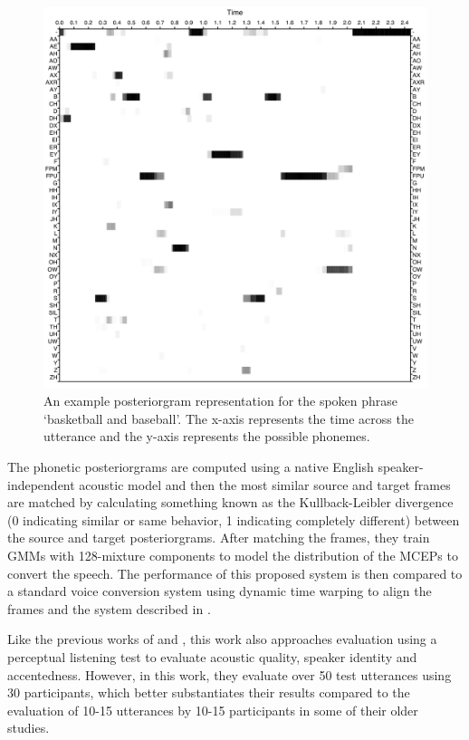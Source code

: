 \documentclass
[
    a4paper,
    twoside,
    12pt,
]
{report}
\begin{document}
\begin{figure}[H]
\centering
\includegraphics[scale=0.22]{img/phonetic-postgram.png}
\caption{An example posteriorgram representation for the spoken phrase `basketball and baseball'. The x-axis represents the time across the utterance and the y-axis represents the possible phonemes.}
\label{fig:phonetic-postgram}
\end{figure}

The phonetic posteriorgrams are computed using a native English
speaker-independent acoustic model and then the most similar source and
target frames are matched by calculating something known as the
Kullback-Leibler divergence (0 indicating similar or same behavior, 1
indicating completely different) between the source and target
posteriorgrams. After matching the frames, they train GMMs with
128-mixture components to model the distribution of the MCEPs to convert
the speech. The performance of this proposed system is then compared to
a standard voice conversion system using dynamic time warping to align
the frames and the system described in \textcite{aryal2014}.

Like the previous works of \textcite{aryal2014} and
\textcite{aryal2015}, this work also approaches evaluation using a
perceptual listening test to evaluate acoustic quality, speaker identity
and accentedness. However, in this work, they evaluate over 50 test
utterances using 30 participants, which better substantiates their
results compared to the evaluation of 10-15 utterances by 10-15
participants in some of their older studies.
\end{document}
